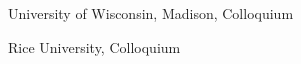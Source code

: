 \documentclass[12pt]{article}
\newenvironment{date_section}
	{
	\vspace{-1ex}
	\leftmargini = 15ex
	 \begin{itemize}[
		 labelsep = *,
		 labelwidth = 9ex,
		 labelindent = 0ex,
		 itemindent = !,
		 font=\normalfont, 
		 align=parleft
		 ]
		{}
		\itemsep=-1.5mm}
	{\end{itemize}\vspace{-2ex}}
\newcommand{\yearmo}[2]{
	\item[ 
		{\makebox[1ex][r]{#1}}
		\hspace{1ex}
		{\makebox[1ex][l]{#2} }
		] }
\begin{document}
\begin{date_section}
				
				
			\yearmo{}{2015}
				University of Wisconsin, Madison,
				Colloquium
				
			\yearmo{}{}
				Rice University,
				Colloquium
				
                
			
			

				

                

\end{date_section}
\end{document}
